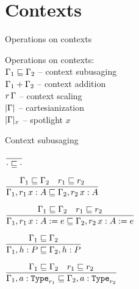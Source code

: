 \section{Contexts}

\begin{frame}{Operations on contexts}

Operations on contexts: \\
$\Gamma_1 \sqsubseteq \Gamma_2$ -- context subusaging \\
$\Gamma_1 + \Gamma_2$ -- context addition \\
$r\, \Gamma$ -- context scaling \\
$| \Gamma |$ -- cartesianization \\
$| \Gamma |_{x}$ -- spotlight $x$

\end{frame}

\begin{frame}{Context subusaging}

\begin{center}
  $\infrule{}{\subusagectx{\emptyctx}{\emptyctx}}$

  \vspace{1em}

  $\infrule{\subusagectx{\Gamma_1}{\Gamma_2} \quad \subusage{r_1}{r_2}}{\subusagectx{\extend{\Gamma_1}[r_1]{x}{A}}{\extend{\Gamma_2}[r_2]{x}{A}}}$

  \vspace{2em}

  $\infrule{\subusagectx{\Gamma_1}{\Gamma_2} \quad \subusage{r_1}{r_2}}{\subusagectx{\extend{\Gamma_1}[r_1]{x}{A}[e]}{\extend{\Gamma_2}[r_2]{x}{A}[e]}}$

  \vspace{2em}

  $\infrule{\subusagectx{\Gamma_1}{\Gamma_2}}{\subusagectx{\assume{\Gamma_1}{h}{P}}{\assume{\Gamma_2}{h}{P}}}$

  \vspace{2em}

  $\infrule{\subusagectx{\Gamma_1}{\Gamma_2} \quad \subusage{r_1}{r_2}}{\subusagectx{\extendtype{\Gamma_1}{a}[r_1]}{\extendtype{\Gamma_2}{a}[r_2]}}$
\end{center}

\end{frame}

